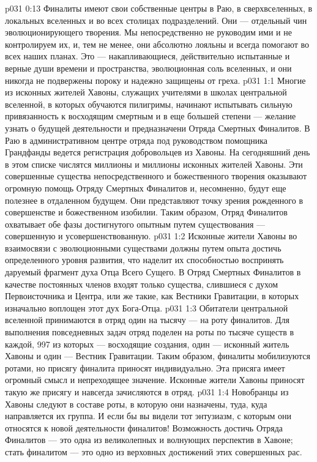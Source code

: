 \vs p031 0:13 Финалиты имеют свои собственные центры в Раю, в сверхвселенных, в локальных вселенных и во всех столицах подразделений. Они --- отдельный чин эволюционирующего творения. Мы непосредственно не руководим ими и не контролируем их, и, тем не менее, они абсолютно лояльны и всегда помогают во всех наших планах. Это --- накапливающиеся, действительно испытанные и верные души времени и пространства, эволюционная соль вселенных, и они никогда не подвержены пороку и надежно защищены от греха.
\vs p031 1:1 Многие из исконных жителей Хавоны, служащих учителями в школах центральной вселенной, в которых обучаются пилигримы, начинают испытывать сильную привязанность к восходящим смертным и в еще большей степени --- желание узнать о будущей деятельности и предназначени Отряда Смертных Финалитов. В Раю в административном центре отряда под руководством помощника Грандфанды ведется регистрация добровольцев из Хавоны. На сегодняшний день в этом списке числятся миллионы и миллионы исконных жителей Хавоны. Эти совершенные существа непосредственного и божественного творения оказывают огромную помощь Отряду Смертных Финалитов и, несомненно, будут еще полезнее в отдаленном будущем. Они представляют точку зрения рожденного в совершенстве и божественном изобилии. Таким образом, Отряд Финалитов охватывает обе фазы достигнутого опытным путем существования --- совершенную и усовершенствованную.
\vs p031 1:2 Исконные жители Хавоны во взаимосвязи с эволюционными существами должны путем опыта достичь определенного уровня развития, что наделит их способностью воспринять даруемый фрагмент духа Отца Всего Сущего. В Отряд Смертных Финалитов в качестве постоянных членов входят только существа, слившиеся с духом Первоисточника и Центра, или же такие, как Вестники Гравитации, в которых изначально воплощен этот дух Бога\hyp{}Отца.
\vs p031 1:3 Обитатели центральной вселенной принимаются в отряд один на тысячу --- на роту финалитов. Для выполнения повседневных задач отряд поделен на роты по тысяче существ в каждой, 997 из которых --- восходящие создания, один --- исконный житель Хавоны и один --- Вестник Гравитации. Таким образом, финалиты мобилизуются ротами, но присягу финалита приносят индивидуально. Эта присяга имеет огромный смысл и непреходящее значение. Исконные жители Хавоны приносят такую же присягу и навсегда зачисляются в отряд.
\vs p031 1:4 Новобранцы из Хавоны следуют в составе роты, в которую они назначены, туда, куда направляется их группа. И если бы вы видели тот энтузиазм, с которым они относятся к новой деятельности финалитов! Возможность достичь Отряда Финалитов --- это одна из великолепных и волнующих перспектив в Хавоне; стать финалитом --- это одно из верховных достижений этих совершенных рас.

